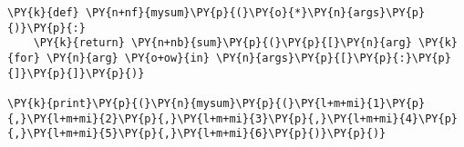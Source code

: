 \begin{Verbatim}[commandchars=\\\{\}]
\PY{k}{def} \PY{n+nf}{mysum}\PY{p}{(}\PY{o}{*}\PY{n}{args}\PY{p}{)}\PY{p}{:}
    \PY{k}{return} \PY{n+nb}{sum}\PY{p}{(}\PY{p}{[}\PY{n}{arg} \PY{k}{for} \PY{n}{arg} \PY{o+ow}{in} \PY{n}{args}\PY{p}{[}\PY{p}{:}\PY{p}{]}\PY{p}{]}\PY{p}{)}

\PY{k}{print}\PY{p}{(}\PY{n}{mysum}\PY{p}{(}\PY{l+m+mi}{1}\PY{p}{,}\PY{l+m+mi}{2}\PY{p}{,}\PY{l+m+mi}{3}\PY{p}{,}\PY{l+m+mi}{4}\PY{p}{,}\PY{l+m+mi}{5}\PY{p}{,}\PY{l+m+mi}{6}\PY{p}{)}\PY{p}{)}
\end{Verbatim}
